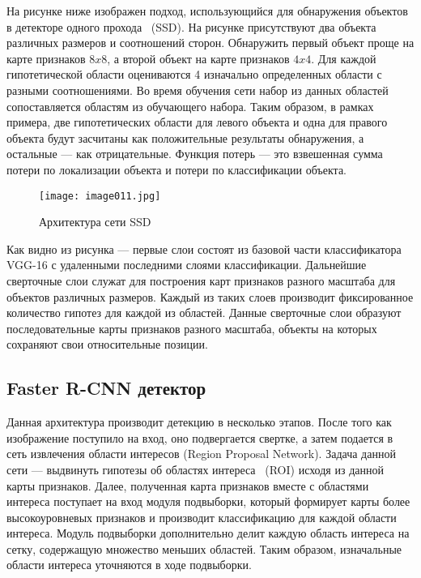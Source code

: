 На рисунке ниже изображен подход, использующийся для обнаружения объектов в детекторе одного прохода ~(SSD). На рисунке присутствуют два объекта различных размеров и соотношений сторон. Обнаружить первый объект проще на карте признаков \(8x8\), а второй объект на карте признаков \(4x4\). Для каждой гипотетической области оцениваются 4 изначально определенных области с разными соотношениями. Во время обучения сети набор из данных областей сопоставляется областям из обучающего набора. Таким образом, в рамках примера, две гипотетических области для левого объекта и одна для правого объекта будут засчитаны как положительные результаты обнаружения, а остальные — как отрицательные. Функция потерь — это взвешенная сумма потери по локализации объекта и потери по классификации объекта.

\begin{figure}[htbp]
\centering
\texttt{[image: image011.jpg]}
\caption{Архитектура сети SSD\cite{fourteen}}%
\label{fig:how-to-do-research}
\end{figure}

Как видно из рисунка — первые слои состоят из базовой части классификатора VGG-16 с удаленными последними слоями классификации. Дальнейшие сверточные слои служат для построения карт признаков разного масштаба для объектов различных размеров. Каждый из таких слоев производит фиксированное количество гипотез для каждой из областей. Данные сверточные слои образуют последовательные карты признаков разного масштаба, объекты на которых сохраняют свои относительные позиции.

\subsection{Faster R-CNN детектор}

Данная архитектура производит детекцию в несколько этапов. После того как изображение поступило на вход, оно подвергается свертке, а затем подается в сеть извлечения области интересов (Region Proposal Network). Задача данной сети — выдвинуть гипотезы об областях интереса ~(ROI) исходя из данной карты признаков. 
Далее, полученная карта признаков вместе с областями интереса поступает на вход модуля подвыборки, который формирует карты более высокоуровневых признаков и производит классификацию для каждой области интереса. Модуль подвыборки дополнительно делит каждую область интереса на сетку, содержащую множество меньших областей. Таким образом, изначальные области интереса уточняются в ходе подвыборки. 

